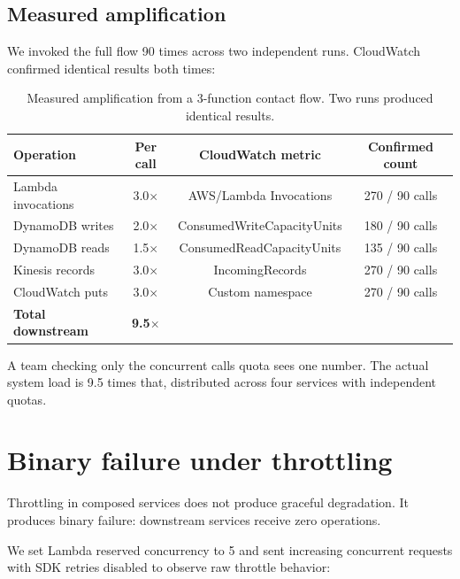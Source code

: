 \documentclass{article}
\begin{document}
\subsection{Measured amplification}

We invoked the full flow 90 times across two independent runs. CloudWatch confirmed identical results both times:

\begin{table}[h]
\centering
\begin{tabular}{@{}lccc@{}}
\toprule
Operation & Per call & CloudWatch metric & Confirmed count \\
\midrule
Lambda invocations & 3.0$\times$ & AWS/Lambda Invocations & 270 / 90 calls \\
DynamoDB writes & 2.0$\times$ & ConsumedWriteCapacityUnits & 180 / 90 calls \\
DynamoDB reads & 1.5$\times$ & ConsumedReadCapacityUnits & 135 / 90 calls \\
Kinesis records & 3.0$\times$ & IncomingRecords & 270 / 90 calls \\
CloudWatch puts & 3.0$\times$ & Custom namespace & 270 / 90 calls \\
\midrule
\textbf{Total downstream} & \textbf{9.5$\times$} & & \\
\bottomrule
\end{tabular}
\caption{Measured amplification from a 3-function contact flow. Two runs produced identical results.}
\label{tab:amplification}
\end{table}

A team checking only the concurrent calls quota sees one number. The actual system load is 9.5 times that, distributed across four services with independent quotas.

\section{Binary failure under throttling}
\label{sec:cascade}

Throttling in composed services does not produce graceful degradation. It produces binary failure: downstream services receive zero operations.

We set Lambda reserved concurrency to 5 and sent increasing concurrent requests with SDK retries disabled to observe raw throttle behavior:
\end{document}
